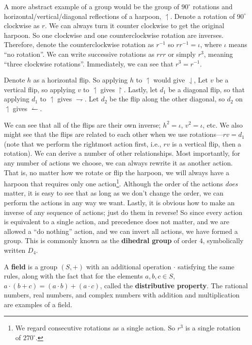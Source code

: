 \documentclass{microdoc}
\newcommand{\defn}[1]{\textbf{#1}}
\begin{document}
A more abstract example of a group would be the group of $90^\circ$
rotations and horizontal/vertical/diagonal reflections of a harpoon,
$\upharpoonleft$. Denote a rotation of $90^\circ$ clockwise as $r$. We
can always turn it counter clockwise to get the original harpoon. So
one clockwise and one counterclockwise rotation are
inverses. Therefore, denote the counterclockwise rotation as $r^{-1}$
so $r r^{-1} = \iota$, where $\iota$ means ``no rotation''. We can
write successive rotations as $rrr$ or simply $r^3$, meaning ``three
clockwise rotations''. Immediately, we can see that $r^3 = r^{-1}$.

Denote $h$ as a horizontal flip. So applying $h$ to $\upharpoonleft$
would give $\downharpoonleft$, Let $v$ be a vertical flip, so applying
$v$ to $\upharpoonleft$ gives $\upharpoonright$. Lastly, let $d_1$ be
a diagonal flip, so that applying $d_1$ to $\upharpoonleft$ gives
$\rightharpoondown$. Let $d_2$ be the flip along the other diagonal,
so $d_2$ on $\upharpoonleft$ gives $\leftharpoonup$.

We can see that all of the flips are their own inverse; $h^2=\iota$,
$v^2=\iota$, etc. We also might see that the flips are related to each
other when we use rotations---$rv = d_1$ (note that we perform the
rightmost action first, i.e., $rv$ is a vertical flip, then a
rotation). We can derive a number of other relationships. Most
importantly, for any number of actions we choose, we can always
rewrite it as another action. That is, no matter how we rotate or flip
the harpoon, we will always have a harpoon that requires only one
action\footnote{We regard consecutive rotations as a single action. So
  $r^3$ is a single rotation of $270^\circ$.}. Although the order of
the actions \emph{does} matter, it is easy to see that as long as we
don't change the order, we can perform the actions in any way we
want. Lastly, it is obvious how to make an inverse of any sequence of
actions; just do them in reverse! So since every action is equivalent
to a single action, and precedence does not matter, and we are allowed
a ``do nothing'' action, and we can invert all actions, we have formed
a group. This is commonly known as the \defn{dihedral group} of order $4$,
symbolically written $D_4$.

A \defn{field} is a group $(S,+)$ with an additional operation $\cdot$
satisfying the same rules, along with the fact that for the elements
$a,b,c\in S$, $a\cdot(b+c) = (a\cdot b)+(a\cdot c)$, called the
\defn{distributive property}. The rational numbers, real numbers, and
complex numbers with addition and multiplication are examples of a
field.
\end{document}
